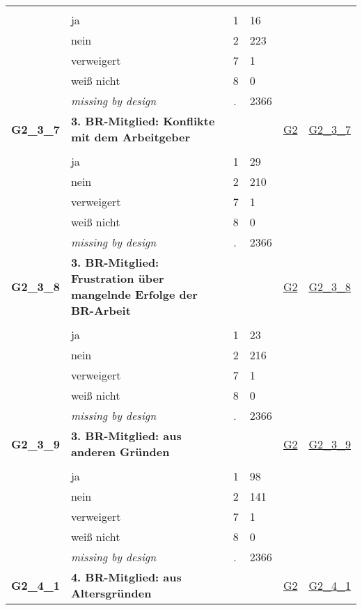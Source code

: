 \begin{longtable}{| L{2.45cm} | L{6cm} | C{1.5cm} | R{1cm} | C{2.25cm} | C{2.25cm} |}
   &  &  &  &  &  \\ 
   & ja & 1 & 16 &  &  \\ 
   & nein & 2 & 223 &  &  \\ 
   & verweigert & 7 & 1 &  &  \\ 
   & weiß nicht & 8 & 0 &  &  \\ 
   & \textit{missing by design} & \textit{.} & 2366 &  &  \\ 
   \midrule
\textbf{G2\_3\_7}\label{var:G2:3:7} & \textbf{3. BR-Mitglied: Konflikte mit dem Arbeitgeber} &  &  & \hyperref[G2]{G2} & \hyperref[var:suf:G2:3:7]{G2\_3\_7} \\ 
   &  &  &  &  &  \\ 
   & ja & 1 & 29 &  &  \\ 
   & nein & 2 & 210 &  &  \\ 
   & verweigert & 7 & 1 &  &  \\ 
   & weiß nicht & 8 & 0 &  &  \\ 
   & \textit{missing by design} & \textit{.} & 2366 &  &  \\ 
   \midrule
\textbf{G2\_3\_8}\label{var:G2:3:8} & \textbf{3. BR-Mitglied: Frustration über mangelnde Erfolge der BR-Arbeit} &  &  & \hyperref[G2]{G2} & \hyperref[var:suf:G2:3:8]{G2\_3\_8} \\ 
   &  &  &  &  &  \\ 
   & ja & 1 & 23 &  &  \\ 
   & nein & 2 & 216 &  &  \\ 
   & verweigert & 7 & 1 &  &  \\ 
   & weiß nicht & 8 & 0 &  &  \\ 
   & \textit{missing by design} & \textit{.} & 2366 &  &  \\ 
   \midrule
\textbf{G2\_3\_9}\label{var:G2:3:9} & \textbf{3. BR-Mitglied: aus anderen Gründen} &  &  & \hyperref[G2]{G2} & \hyperref[var:suf:G2:3:9]{G2\_3\_9} \\ 
   &  &  &  &  &  \\ 
   & ja & 1 & 98 &  &  \\ 
   & nein & 2 & 141 &  &  \\ 
   & verweigert & 7 & 1 &  &  \\ 
   & weiß nicht & 8 & 0 &  &  \\ 
   & \textit{missing by design} & \textit{.} & 2366 &  &  \\ 
   \midrule
\textbf{G2\_4\_1}\label{var:G2:4:1} & \textbf{4. BR-Mitglied: aus Altersgründen} &  &  & \hyperref[G2]{G2} & \hyperref[var:suf:G2:4:1]{G2\_4\_1} \\ 

\end{longtable}
